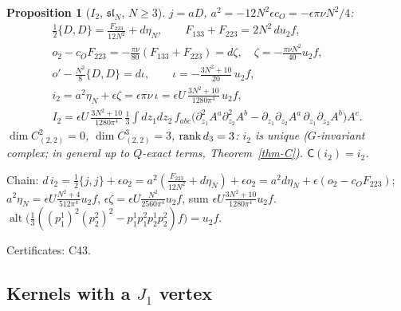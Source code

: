 \documentclass[10pt,a4paper]{article}
\numberwithin{equation}{section}
\newtheorem{proposition}[theorem]{Proposition}
\theoremstyle{definition}
\theoremstyle{remark}
\newcommand{\alt}{\operatorname{alt}}
\newcommand{\fsl}{\mathfrak{sl}}
\newcommand{\cert}[1]{\par\noindent\textup{Certificates: #1.}\par}
\newcommand{\uf}{u_2f}
\begin{document}
\begin{proposition}[$I_2$, $\fsl_N$, $N\ge3$]\label{prop-I2}
$j=aD$, $a^2=-12N^2\epsilon c_O=-\epsilon\pi\nu N^2/4$:
\begin{gather}
\tfrac12\{D,D\}=\frac{F_{223}}{12N^2}+d\eta_N,\qquad F_{133}+F_{223}=2N^2\,d\uf,\\ o_2-c_OF_{223}=-\frac{\pi\nu}{80}(F_{133}+F_{223})=d\zeta,\quad \zeta=-\frac{\pi\nu N^2}{40}\uf,\\
o'-\tfrac{N^2}8\{D,D\}=d\iota,\qquad \iota=-\frac{3N^2+10}{20}\,\uf,\\
i_2=a^2\eta_N+\epsilon\zeta=\epsilon\pi\nu\,\iota=\epsilon U\,\frac{3N^2+10}{1280\pi^4}\,\uf,\\ I_2=\epsilon U\,\frac{3N^2+10}{1280\pi^4}\,\frac13\int dz_1dz_2\,f_{abc}\big(\partial_{z_1}^2A^a\partial_{z_2}^2A^b-\partial_{z_1}\partial_{z_2}A^a\,\partial_{z_1}\partial_{z_2}A^b\big)A^c .
\end{gather}
$\dim C^2_{(2,2)}=0$, $\dim C^3_{(2,2)}=3$, ${\rm rank}\,d_3=3$: $i_2$ is unique ($G$-invariant complex; in general up to $Q$-exact terms, Theorem~\ref{thm-C}). $\mathsf C(i_2)=i_2$.
\end{proposition}
Chain: $d\,i_2=\frac12\{j,j\}+\epsilon o_2=a^2(\frac{F_{223}}{12N^2}+d\eta_N)+\epsilon o_2=a^2d\eta_N+\epsilon(o_2-c_OF_{223})$; $a^2\eta_N=\epsilon U\frac{N^2+4}{512\pi^4}\uf$, $\epsilon\zeta=\epsilon U\frac{N^2}{2560\pi^4}\uf$, sum $\epsilon U\frac{3N^2+10}{1280\pi^4}\uf$. $\alt\big(\frac13((p_1^1)^2(p_2^2)^2-p_1^1p_1^2p_2^1p_2^2)f\big)=\uf$.
\cert{C43}

\subsection{\texorpdfstring{Kernels with a $J_1$ vertex}{Kernels with a J1 vertex}}
\end{document}
